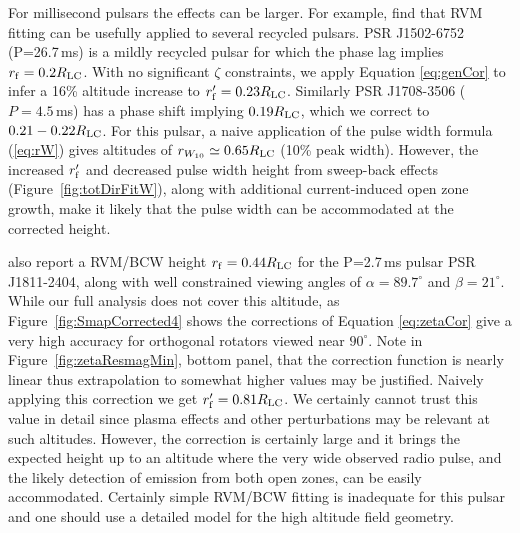 	For millisecond pulsars the effects can be larger. For example, \cite{keith2012high} 
find that RVM fitting can be usefully applied to several 
recycled pulsars. PSR J1502-6752 (P=26.7\,ms) is a mildly recycled
pulsar for which the phase lag implies $r_{\rm{f}}=0.2R_{\rm{LC}}$. With no significant $\zeta$
constraints, we apply Equation \ref{eq:genCor} to infer a 16\% altitude increase
to $r^\prime_{\rm{f}}=0.23R_{\rm{LC}}$. Similarly PSR J1708-3506 ($P=4.5\,$ms) has a phase shift 
implying $0.19R_{\rm{LC}}$, which we correct to $0.21-0.22 R_{\rm{LC}}$. For this pulsar,
a naive application of the pulse width formula (\ref{eq:rW}) gives altitudes of 
$r_{W_{10}}\simeq0.65R_{\rm{LC}}$ (10\% peak width). 
However, the increased $r^\prime_{\rm{f}}$ and decreased pulse width height
from sweep-back effects (Figure~\ref{fig:totDirFitW}), along with additional current-induced
open zone growth, make it likely that the pulse width can be accommodated at the corrected height.


 \cite{keith2012high} also report a RVM/BCW height $r_{\rm{f}}= 0.44R_{\rm{LC}}$ for
the P=2.7\,ms pulsar PSR J1811-2404, along with well constrained viewing angles of
$\alpha=89.7^{\circ}$ and $\beta=21^{\circ}$. While our full analysis does
not cover this altitude, as Figure~\ref{fig:SmapCorrected4} shows the corrections
of Equation \ref{eq:zetaCor} give a very high accuracy for orthogonal
rotators viewed near $90^\circ$.  Note in Figure~\ref{fig:zetaResmagMin}, bottom
panel, that the correction function is nearly linear thus extrapolation to 
somewhat higher values may be justified.  Naively applying this correction we get
$r_{\rm{f}}'=0.81R_{\rm{LC}}$. We certainly cannot trust this value in detail since plasma 
effects and other perturbations may be relevant at such altitudes.  However, the
correction is certainly large and it brings the expected height up to an altitude 
where the very wide observed radio pulse, and the likely detection of emission 
from both open zones, can be easily accommodated.
Certainly simple RVM/BCW fitting is inadequate for this pulsar and one
should use a detailed model for the high altitude field geometry.



\bigskip
\bigskip

